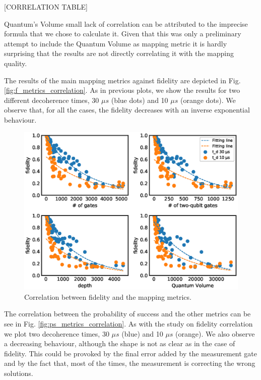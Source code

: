 [CORRELATION TABLE]

Quantum's Volume small lack of correlation can be attributed to the imprecise formula that we chose to calculate it.
Given that this was only a preliminary attempt to include the Quantum Volume as mapping metric it is hardly surprising that the results are not directly correlating it with the mapping quality.

The results of the main mapping metrics against fidelity are depicted in Fig. \ref{fig:f_metrics_correlation}.
As in previous plots, we show the results for two different decoherence times, 30 \(\mu s\) (blue dots) and 10 \(\mu s\) (orange dots).
We observe that, for all the cases, the fidelity decreases with an inverse exponential behaviour.

\begin{figure}[htbp]
\centering
\includegraphics[width=\textwidth]{figures/f_metrics_correlation.eps}
\caption{\label{fig:org7ec59b9}
Correlation between fidelity and the mapping metrics.}
\end{figure}

The correlation between the probability of success and the other metrics can be see in Fig. \ref{fig:ps_metrics_correlation}.
As with the study on fidelity correlation we plot two decoherence times, 30 \(\mu s\) (blue) and 10 \(\mu s\) (orange).
We also observe a decreasing behaviour, although the shape is not as clear as in the case of fidelity.
This could be provoked by the final error added by the measurement gate and by the fact that, most of the times, the measurement is correcting the wrong solutions.

